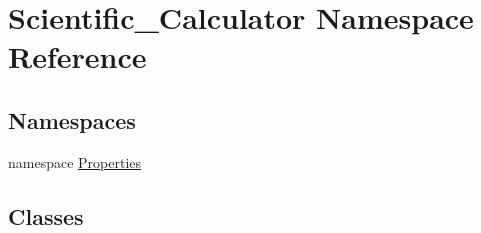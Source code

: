 \hypertarget{namespace_scientific___calculator}{}\section{Scientific\+\_\+\+Calculator Namespace Reference}
\label{namespace_scientific___calculator}
\subsection*{Namespaces}
\begin{DoxyCompactItemize}
\item 
namespace \hyperlink{namespace_scientific___calculator_1_1_properties}{Properties}
\end{DoxyCompactItemize}
\subsection*{Classes}
